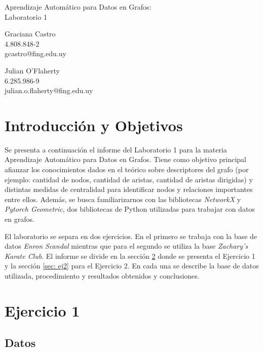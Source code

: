 \documentclass{article}
\begin{document}
\begin{center}
{\LARGE Aprendizaje Automático para Datos en Grafos:} \\
{\LARGE Laboratorio 1} \\
\vspace{1em}
\begin{minipage}{0.45\textwidth}
\centering
Graciana Castro \\
4.808.848-2 \\
gcastro@fing.edu.uy
\end{minipage}
\hfill
\begin{minipage}{0.45\textwidth}
\centering
Julian O'Flaherty \\
6.285.986-9 \\
julian.o.flaherty@fing.edu.uy
\end{minipage}
\end{center}


\section{Introducción y Objetivos}
Se presenta a continuación el informe del Laboratorio 1 para la materia Aprendizaje Automático para Datos en Grafos. Tiene como objetivo principal afianzar los conocimientos dados en el teórico sobre descriptores del grafo (por ejemplo: cantidad de nodos, cantidad de aristas, cantidad de aristas dirigidas) y distintas medidas de centralidad para identificar nodos y relaciones importantes entre ellos. Además, se busca familiarizarnos con las bibliotecas \textit{NetworkX} y \textit{Pytorch Geometric}, dos bibliotecas de Python utilizadas para trabajar con datos en grafos. 

El laboratorio se separa en dos ejercicios. En el primero se trabaja con la base de datos \textit{Enron Scandal} mientras que para el segundo se utiliza la base \textit{Zachary's Karate Club}. El informe se divide en la sección \ref{sec: ej1} donde se presenta el Ejercicio 1 y la sección \ref{sec: ej2} para el Ejercicio 2. En cada una se describe la base de datos utilizada, procedimiento y resultados obtenidos y conclusiones.  

\section{Ejercicio 1} \label{sec: ej1}


\subsection{Datos} 
\end{document}
